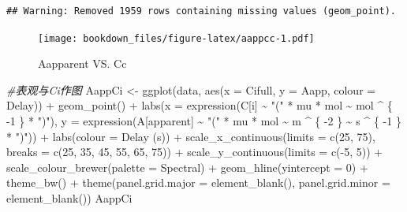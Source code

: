 \documentclass[
]{krantz}
\makeatletter
\newenvironment{Shaded}{\begin{snugshade}}{\end{snugshade}}
\newcommand{\AttributeTok}[1]{\textcolor[rgb]{0.77,0.63,0.00}{#1}}
\newcommand{\CommentTok}[1]{\textcolor[rgb]{0.56,0.35,0.01}{\textit{#1}}}
\newcommand{\DecValTok}[1]{\textcolor[rgb]{0.00,0.00,0.81}{#1}}
\newcommand{\FunctionTok}[1]{\textcolor[rgb]{0.00,0.00,0.00}{#1}}
\newcommand{\NormalTok}[1]{#1}
\newcommand{\OtherTok}[1]{\textcolor[rgb]{0.56,0.35,0.01}{#1}}
\newcommand{\SpecialCharTok}[1]{\textcolor[rgb]{0.00,0.00,0.00}{#1}}
\newcommand{\StringTok}[1]{\textcolor[rgb]{0.31,0.60,0.02}{#1}}
\newenvironment{kframe}{%
\medskip{}
\setlength{\fboxsep}{.8em}
 \def\at@end@of@kframe{}%
 \ifinner\ifhmode%
  \def\at@end@of@kframe{\end{minipage}}%
  \begin{minipage}{\columnwidth}%
 \fi\fi%
 \def\FrameCommand##1{\hskip\@totalleftmargin \hskip-\fboxsep
 \colorbox{shadecolor}{##1}\hskip-\fboxsep
     \hskip-\linewidth \hskip-\@totalleftmargin \hskip\columnwidth}%
 \MakeFramed {\advance\hsize-\width
   \@totalleftmargin\z@ \linewidth\hsize
   \@setminipage}}%
 {\par\unskip\endMakeFramed%
 \at@end@of@kframe}
\renewenvironment{Shaded}{\begin{kframe}}{\end{kframe}}
\makeatother
\begin{document}
\begin{verbatim}
## Warning: Removed 1959 rows containing missing values (geom_point).
\end{verbatim}

\begin{figure}
\centering
\texttt{[image: bookdown\_files/figure-latex/aappcc-1.pdf]}
\caption{\label{fig:aappcc}Aapparent VS. Cc}
\end{figure}

\begin{Shaded}
\begin{Highlighting}[]
\CommentTok{\#表观与Ci作图}
\NormalTok{AappCi }\OtherTok{\textless{}{-}} \FunctionTok{ggplot}\NormalTok{(data, }\FunctionTok{aes}\NormalTok{(}\AttributeTok{x =}\NormalTok{ Cifull, }\AttributeTok{y =}\NormalTok{ Aapp, }\AttributeTok{colour =}\NormalTok{ Delay)) }\SpecialCharTok{+}
  \FunctionTok{geom\_point}\NormalTok{() }\SpecialCharTok{+}
  \FunctionTok{labs}\NormalTok{(}\AttributeTok{x =} \FunctionTok{expression}\NormalTok{(C[i] }\SpecialCharTok{\textasciitilde{}} \StringTok{"("} \SpecialCharTok{*}\NormalTok{ mu }\SpecialCharTok{*}\NormalTok{ mol }\SpecialCharTok{\textasciitilde{}}\NormalTok{ mol }\SpecialCharTok{\^{}}\NormalTok{ \{}
    \SpecialCharTok{{-}}\DecValTok{1}
\NormalTok{  \} }\SpecialCharTok{*} \StringTok{")"}\NormalTok{),}
  \AttributeTok{y =} \FunctionTok{expression}\NormalTok{(A[apparent] }\SpecialCharTok{\textasciitilde{}} \StringTok{"("} \SpecialCharTok{*}\NormalTok{ mu }\SpecialCharTok{*}\NormalTok{ mol }\SpecialCharTok{\textasciitilde{}}\NormalTok{ m }\SpecialCharTok{\^{}}\NormalTok{ \{}
    \SpecialCharTok{{-}}\DecValTok{2}
\NormalTok{  \} }\SpecialCharTok{\textasciitilde{}}\NormalTok{ s }\SpecialCharTok{\^{}}\NormalTok{ \{}
    \SpecialCharTok{{-}}\DecValTok{1}
\NormalTok{  \} }\SpecialCharTok{*} \StringTok{")"}\NormalTok{)) }\SpecialCharTok{+}
  \FunctionTok{labs}\NormalTok{(}\AttributeTok{colour =} \StringTok{\textquotesingle{}Delay (s)\textquotesingle{}}\NormalTok{) }\SpecialCharTok{+}
  \FunctionTok{scale\_x\_continuous}\NormalTok{(}\AttributeTok{limits =} \FunctionTok{c}\NormalTok{(}\DecValTok{25}\NormalTok{, }\DecValTok{75}\NormalTok{),}
                     \AttributeTok{breaks =} \FunctionTok{c}\NormalTok{(}\DecValTok{25}\NormalTok{, }\DecValTok{35}\NormalTok{, }\DecValTok{45}\NormalTok{, }\DecValTok{55}\NormalTok{, }\DecValTok{65}\NormalTok{, }\DecValTok{75}\NormalTok{)) }\SpecialCharTok{+}
  \FunctionTok{scale\_y\_continuous}\NormalTok{(}\AttributeTok{limits =} \FunctionTok{c}\NormalTok{(}\SpecialCharTok{{-}}\DecValTok{5}\NormalTok{, }\DecValTok{5}\NormalTok{)) }\SpecialCharTok{+}
  \FunctionTok{scale\_colour\_brewer}\NormalTok{(}\AttributeTok{palette =} \StringTok{\textquotesingle{}Spectral\textquotesingle{}}\NormalTok{) }\SpecialCharTok{+}
  \FunctionTok{geom\_hline}\NormalTok{(}\AttributeTok{yintercept =} \DecValTok{0}\NormalTok{) }\SpecialCharTok{+}
  \FunctionTok{theme\_bw}\NormalTok{() }\SpecialCharTok{+}
  \FunctionTok{theme}\NormalTok{(}\AttributeTok{panel.grid.major =} \FunctionTok{element\_blank}\NormalTok{(),}
        \AttributeTok{panel.grid.minor =} \FunctionTok{element\_blank}\NormalTok{())}
\NormalTok{AappCi}
\end{Highlighting}
\end{Shaded}
\end{document}
